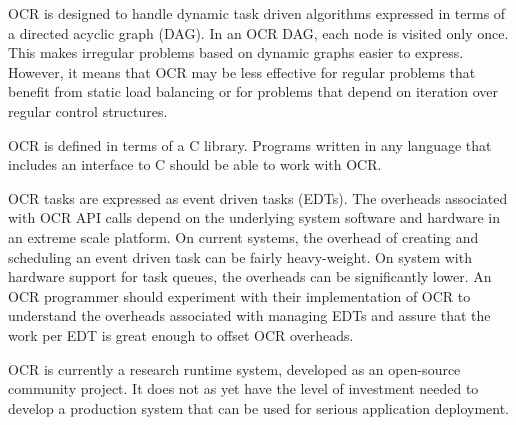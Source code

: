 OCR is designed to handle dynamic task driven algorithms expressed in
terms of a directed acyclic graph (DAG). In an OCR DAG, each node is
visited only once. This makes irregular problems based on dynamic
graphs easier to express. However, it means that OCR may be less
effective for regular problems that benefit from static load balancing
or for problems that depend on iteration over regular control
structures.
%

OCR is defined in terms of a C library. Programs written in any
language that includes an interface to C should be able to work with
OCR.

OCR tasks are expressed as event driven tasks (EDTs).
The overheads associated with OCR API calls depend on the underlying system software and
hardware in an extreme scale platform.  On current systems, the overhead of
creating and scheduling an event driven task can be fairly heavy-weight.
On system with hardware support for task queues, the
overheads can be significantly lower.  An OCR programmer should experiment with their
implementation of OCR to understand the overheads associated with managing EDTs and
assure that the work per EDT is great enough to offset OCR overheads.

OCR is currently a research runtime system, developed as an
open-source community project. It does not as yet have the level of
investment needed to develop a production system that can be used for
serious application deployment.
